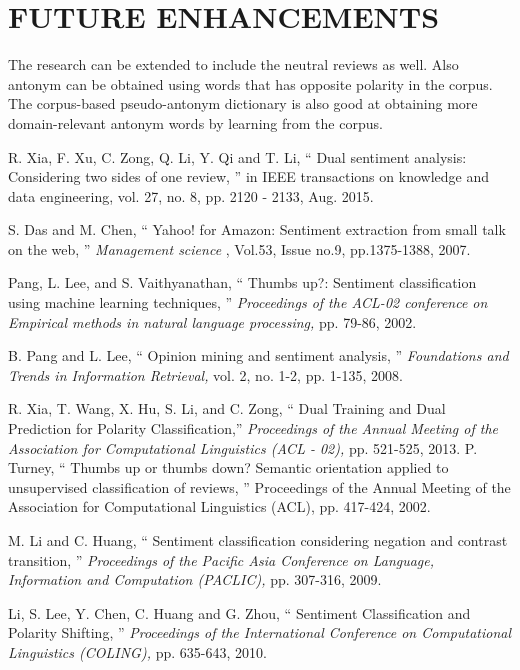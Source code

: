 \documentclass[oneside,a4paper,12pt]{pictreport}
\begin{document}
\chapter{FUTURE ENHANCEMENTS} 
The research can be extended to include the neutral reviews as well.
Also antonym can be obtained using words that has opposite polarity in the corpus.
The corpus-based pseudo-antonym dictionary is also good at obtaining
more domain-relevant antonym words by learning from the
corpus.


\begin{thebibliography}{20}



R. Xia, F. Xu, C. Zong, Q. Li, Y. Qi and T. Li, `` Dual sentiment analysis: Considering  two  sides  of  one 
review, '' in IEEE transactions on knowledge and data engineering, vol. 27, no. 8, pp. 2120
-
2133, Aug. 2015.

  S. Das and M. Chen, `` Yahoo! for Amazon: Sentiment extraction from small talk on the web, '' {\em Management science} , Vol.53, Issue no.9, pp.1375-1388, 2007.

  
  
  Pang, L. Lee, and S. Vaithyanathan, `` Thumbs up?: Sentiment classification using machine learning techniques, '' {\em Proceedings of the ACL-02 conference on Empirical methods in natural language processing,}
  pp. 79-86, 2002.
  
  B. Pang and L. Lee, `` Opinion mining and sentiment analysis, '' {\em Foundations
  and Trends in Information Retrieval,} vol. 2, no. 1-2, pp. 1-135, 2008.
  
  R. Xia, T. Wang, X. Hu, S. Li, and C. Zong, `` Dual Training and Dual
Prediction for Polarity Classification,'' {\em Proceedings of the Annual 
Meeting of the Association for Computational Linguistics (ACL - 02),} pp. 521-525,
2013.
  P. Turney, `` Thumbs up or thumbs down? Semantic orientation applied to unsupervised classification of reviews, '' Proceedings of the Annual Meeting of the Association for Computational Linguistics (ACL), pp. 417-424, 2002.

  
  M. Li and C. Huang, `` Sentiment classification considering negation
and contrast transition, '' {\em Proceedings of the Pacific Asia Conference on
Language, Information and Computation (PACLIC),}  pp. 307-316, 2009.


  Li, S. Lee, Y. Chen, C. Huang and G. Zhou, `` Sentiment 
  Classification and Polarity Shifting, '' {\em Proceedings of the International Conference on
  Computational Linguistics (COLING),} pp. 635-643, 2010.
  

\end{thebibliography}
\end{document}
